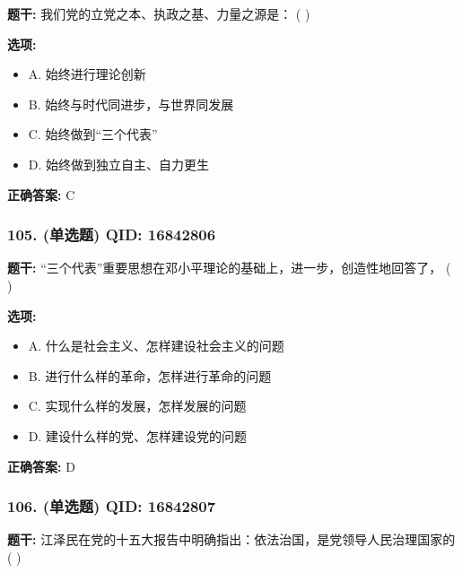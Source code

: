 \documentclass[12pt,UTF8]{ctexart}
\begin{document}
\textbf{题干:}
我们党的立党之本、执政之基、力量之源是： ( )

\textbf{选项:}
\begin{itemize}[leftmargin=*]

  \item A. 始终进行理论创新

  \item B. 始终与时代同进步，与世界同发展

  \item C. 始终做到“三个代表”

  \item D. 始终做到独立自主、自力更生

\end{itemize}

\textbf{正确答案:}
C

\vspace{0.3em}\hrulefill\vspace{0.7em}

\subsubsection*{105. (单选题) \small QID: 16842806}

\textbf{题干:}
“三个代表”重要思想在邓小平理论的基础上，进一步，创造性地回答了， ( )

\textbf{选项:}
\begin{itemize}[leftmargin=*]

  \item A. 什么是社会主义、怎样建设社会主义的问题

  \item B. 进行什么样的革命，怎样进行革命的问题

  \item C. 实现什么样的发展，怎样发展的问题

  \item D. 建设什么样的党、怎样建设党的问题

\end{itemize}

\textbf{正确答案:}
D

\vspace{0.3em}\hrulefill\vspace{0.7em}

\subsubsection*{106. (单选题) \small QID: 16842807}

\textbf{题干:}
江泽民在党的十五大报告中明确指出：依法治国，是党领导人民治理国家的 ( )
\end{document}

